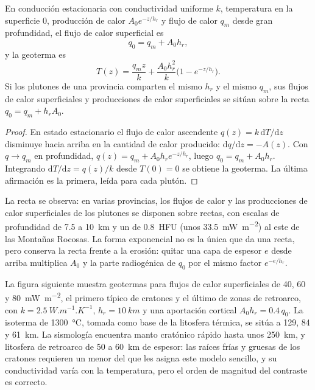 \begin{proposition}\label{prop:b3:lithosphere-thermal-models:exponential}
En conducción estacionaria con conductividad uniforme $k$, temperatura en la superficie $0$,
producción de calor $A_0e^{-z/h_r}$ y flujo de calor $q_m$ desde gran profundidad, el
flujo de calor superficial es
\[
  q_0 = q_m + A_0h_r,
\]
y la geoterma es
\[
  T(z) = \frac{q_mz}{k} + \frac{A_0h_r^2}{k}\bigl(1 - e^{-z/h_r}\bigr).
\]
Si los plutones de una provincia comparten el mismo $h_r$ y el mismo $q_m$, sus
flujos de calor superficiales y producciones de calor superficiales se sitúan sobre la recta
$q_0 = q_m + h_rA_0$.
\end{proposition}

\begin{proof}
En estado estacionario el flujo de calor ascendente $q(z) = k\,\mathrm dT/\mathrm dz$ disminuye
hacia arriba en la cantidad de calor producido: $\mathrm dq/\mathrm dz = -A(z)$. Con $q \to q_m$
en profundidad, $q(z) = q_m + A_0h_re^{-z/h_r}$, luego $q_0 = q_m + A_0h_r$. Integrando
$\mathrm dT/\mathrm dz = q(z)/k$ desde $T(0) = 0$ se obtiene la geoterma. La última
afirmación es la primera, leída para cada plutón.
\end{proof}

La recta se observa: en varias provincias, los flujos de calor y las producciones de calor superficiales
de los plutones se disponen sobre rectas, con escalas de profundidad de 7.5 a
\qty{10}{km} y un  de \qty{0.8}{HFU} (unos
\qty{33.5}{mW.m^{-2}}) al este de las Montañas Rocosas. La forma exponencial no es
la única que da una recta, pero conserva la recta frente a la erosión: quitar una capa de espesor $e$ desde arriba multiplica
$A_0$ y la parte radiogénica de $q_0$ por el mismo factor $e^{-e/h_r}$.

La figura siguiente muestra geotermas para flujos de calor superficiales de 40, 60 y
\qty{80}{mW.m^{-2}}, el primero típico de cratones y el último de zonas de
retroarco, con $k = \qty{2.5}{W.m^{-1}.K^{-1}}$, $h_r = \qty{10}{km}$ y una
aportación cortical $A_0h_r = 0.4\,q_0$. La isoterma de \qty{1300}{\celsius}, tomada como
base de la litosfera térmica, se sitúa a 129, 84 y \qty{61}{km}.
La sismología encuentra manto cratónico rápido hasta unos \qty{250}{km}, y litosfera de retroarco
de 50 a \qty{60}{km} de espesor: las raíces frías y gruesas de los cratones requieren un
 menor del que les asigna este modelo sencillo, y su
conductividad varía con la temperatura, pero el orden de magnitud del contraste es correcto.

